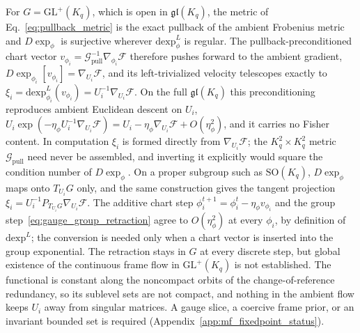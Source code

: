 \documentclass[11pt]{article}
\begin{document}
For $G = \mathrm{GL}^+(K_q)$, which is open in $\mathfrak{gl}(K_q)$, the metric of Eq.~\eqref{eq:pullback_metric} is the exact pullback of the ambient Frobenius metric and $D\exp_\phi$ is surjective wherever $\mathrm{dexp}^{L}_\phi$ is regular. The pullback-preconditioned chart vector $v_{\phi_i} = \mathcal{G}_{\mathrm{pull}}^{-1}\nabla_{\phi_i}\mathcal{F}$ therefore pushes forward to the ambient gradient, $D\exp_{\phi_i}[v_{\phi_i}] = \nabla_{U_i}\mathcal{F}$, and its left-trivialized velocity telescopes exactly to $\xi_i = \mathrm{dexp}^{L}_{\phi_i}(v_{\phi_i}) = U_i^{-1}\nabla_{U_i}\mathcal{F}$. On the full $\mathfrak{gl}(K_q)$ this preconditioning reproduces ambient Euclidean descent on $U_i$, $U_i\exp(-\eta_\phi U_i^{-1}\nabla_{U_i}\mathcal{F}) = U_i - \eta_\phi\nabla_{U_i}\mathcal{F} + O(\eta_\phi^2)$, and it carries no Fisher content. In computation $\xi_i$ is formed directly from $\nabla_{U_i}\mathcal{F}$; the $K_q^2\times K_q^2$ metric $\mathcal{G}_{\mathrm{pull}}$ need never be assembled, and inverting it explicitly would square the condition number of $D\exp_\phi$. On a proper subgroup such as $\mathrm{SO}(K_q)$, $D\exp_\phi$ maps onto $T_{U_i}G$ only, and the same construction gives the tangent projection $\xi_i = U_i^{-1}P_{T_{U_i}G}\nabla_{U_i}\mathcal{F}$. The additive chart step $\phi_i^{t+1} = \phi_i^t - \eta_\phi v_{\phi_i}$ and the group step~\eqref{eq:gauge_group_retraction} agree to $O(\eta_\phi^2)$ at every $\phi_i$, by definition of $\mathrm{dexp}^{L}$; the conversion is needed only when a chart vector is inserted into the group exponential. The retraction stays in $G$ at every discrete step, but global existence of the continuous frame flow in $\mathrm{GL}^+(K_q)$ is not established. The functional is constant along the noncompact orbits of the change-of-reference redundancy, so its sublevel sets are not compact, and nothing in the ambient flow keeps $U_i$ away from singular matrices. A gauge slice, a coercive frame prior, or an invariant bounded set is required (Appendix~\ref{app:mf_fixedpoint_status}).
\end{document}
